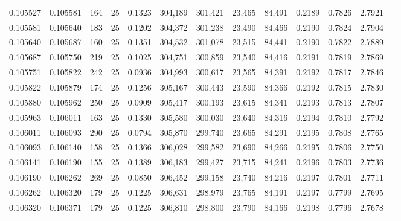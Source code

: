 \begin{tabular}{rrrrrrrrrrrrr}
0.105527 & 0.105581 &   164 &  25 &                                     0.1323 & 304,189 & 301,421 &  23,465 &  84,491 & 0.2189 & 0.7826 & 2.7921 \\
0.105581 & 0.105640 &   183 &  25 &                                     0.1202 & 304,372 & 301,238 &  23,490 &  84,466 & 0.2190 & 0.7824 & 2.7904 \\
0.105640 & 0.105687 &   160 &  25 &                                     0.1351 & 304,532 & 301,078 &  23,515 &  84,441 & 0.2190 & 0.7822 & 2.7889 \\
0.105687 & 0.105750 &   219 &  25 &                                     0.1025 & 304,751 & 300,859 &  23,540 &  84,416 & 0.2191 & 0.7819 & 2.7869 \\
0.105751 & 0.105822 &   242 &  25 &                                     0.0936 & 304,993 & 300,617 &  23,565 &  84,391 & 0.2192 & 0.7817 & 2.7846 \\
0.105822 & 0.105879 &   174 &  25 &                                     0.1256 & 305,167 & 300,443 &  23,590 &  84,366 & 0.2192 & 0.7815 & 2.7830 \\
0.105880 & 0.105962 &   250 &  25 &                                     0.0909 & 305,417 & 300,193 &  23,615 &  84,341 & 0.2193 & 0.7813 & 2.7807 \\
0.105963 & 0.106011 &   163 &  25 &                                     0.1330 & 305,580 & 300,030 &  23,640 &  84,316 & 0.2194 & 0.7810 & 2.7792 \\
0.106011 & 0.106093 &   290 &  25 &                                     0.0794 & 305,870 & 299,740 &  23,665 &  84,291 & 0.2195 & 0.7808 & 2.7765 \\
0.106093 & 0.106140 &   158 &  25 &                                     0.1366 & 306,028 & 299,582 &  23,690 &  84,266 & 0.2195 & 0.7806 & 2.7750 \\
0.106141 & 0.106190 &   155 &  25 &                                     0.1389 & 306,183 & 299,427 &  23,715 &  84,241 & 0.2196 & 0.7803 & 2.7736 \\
0.106190 & 0.106262 &   269 &  25 &                                     0.0850 & 306,452 & 299,158 &  23,740 &  84,216 & 0.2197 & 0.7801 & 2.7711 \\
0.106262 & 0.106320 &   179 &  25 &                                     0.1225 & 306,631 & 298,979 &  23,765 &  84,191 & 0.2197 & 0.7799 & 2.7695 \\
0.106320 & 0.106371 &   179 &  25 &                                     0.1225 & 306,810 & 298,800 &  23,790 &  84,166 & 0.2198 & 0.7796 & 2.7678 \\

\end{tabular}
